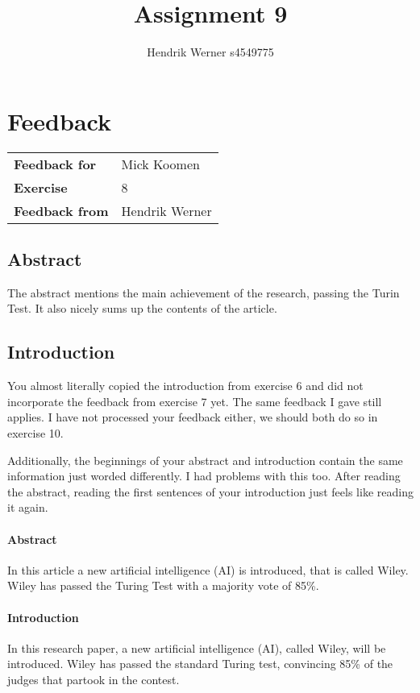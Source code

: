 \documentclass[12pt, a4paper]{article}
\title{Assignment 9}
\author{Hendrik Werner s4549775}
\begin{document}
\maketitle

\clearpage
\section{Feedback}

\begin{tabular}{ll}
	\textbf{Feedback for} & Mick Koomen\\
	\textbf{Exercise} & 8\\
	\textbf{Feedback from} & Hendrik Werner\\
\end{tabular}

\subsection{Abstract}
The abstract mentions the main achievement of the research, passing the Turin Test. It also nicely sums up the contents of the article.

\subsection{Introduction}
You almost literally copied the introduction from exercise 6 and did not incorporate the feedback from exercise 7 yet. The same feedback I gave still applies. I have not processed your feedback either, we should both do so in exercise 10.

Additionally, the beginnings of your abstract and introduction contain the same information just worded differently. I had problems with this too. After reading the abstract, reading the first sentences of your introduction just feels like reading it again.

\begin{multicols}{2}
	\paragraph{Abstract} In this article a new artificial intelligence (AI) is introduced, that is called Wiley. Wiley has passed the Turing Test with a majority vote of 85\%.

	\paragraph{Introduction} In this research paper, a new artificial intelligence (AI), called Wiley, will be
introduced. Wiley has passed the standard Turing test, convincing 85\% of the
judges that partook in the contest.
\end{multicols}
\end{document}
